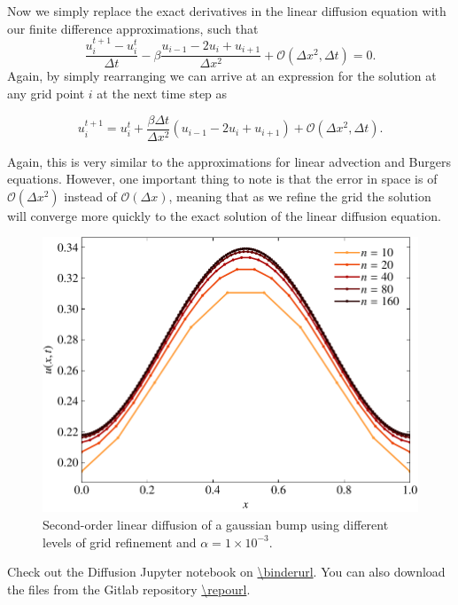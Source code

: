 Now we simply replace the exact derivatives in the linear diffusion equation with our finite difference approximations, such that
\begin{equation}
\frac{u_i^{t+1} - u_{i}^t}{\Delta t} - \beta \frac{u_{i-1} - 2u_i + u_{i+1}}{\Delta x^2} + \mathcal{O}(\Delta x^2,\Delta t) = 0.
\end{equation}
Again, by simply rearranging we can arrive at an expression for the solution at any grid point $i$ at the next time step as
\begin{eqBox}
\begin{equation}
u_i^{t+1}  = u_{i}^t + \frac{\beta \Delta t}{\Delta x^2} \left(u_{i-1} - 2u_i + u_{i+1}\right) + \mathcal{O}(\Delta x^2,\Delta t).
\label{eq:fd_diffusion}
\end{equation}
\end{eqBox}
Again, this is very similar to the approximations for linear advection and Burgers equations. However, one important thing to note is that the error in space is of $\mathcal{O}(\Delta x^2)$ instead of $\mathcal{O}(\Delta x)$, meaning that as we refine the grid the solution will converge more quickly to the exact solution of the linear diffusion equation.
\begin{figure}[htbp]
	\centering
	\includegraphics[width=0.65\linewidth]{Pictures/diffusion_central}
	\caption{Second-order linear diffusion of a gaussian bump using different levels of grid refinement and $\alpha=1\times 10^{-3}$.}
	\label{fig:diffusion_central}
\end{figure}
\begin{jupyternote}
	Check out the Diffusion Jupyter notebook on \url{\binderurl}. You can also download the files from the Gitlab repository \url{\repourl}.
\end{jupyternote}

